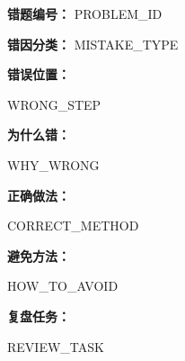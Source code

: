 \begin{mistakeBox}
\textbf{错题编号：} {{PROBLEM_ID}}

\textbf{错因分类：} {{MISTAKE_TYPE}}

\textbf{错误位置：}

{{WRONG_STEP}}

\textbf{为什么错：}

{{WHY_WRONG}}

\textbf{正确做法：}

{{CORRECT_METHOD}}

\textbf{避免方法：}

{{HOW_TO_AVOID}}

\textbf{复盘任务：}

{{REVIEW_TASK}}
\end{mistakeBox}
